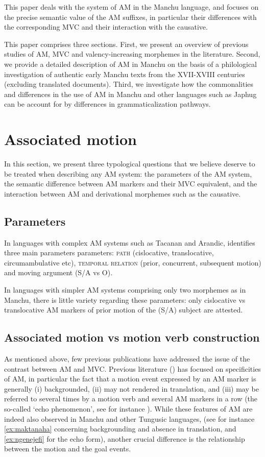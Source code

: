 \documentclass{article}
\begin{document}
This paper deals with the system of AM in the Manchu language, and focuses on the precise semantic value of the AM suffixes, in particular their differences with the corresponding MVC and their interaction with the causative. 

This paper comprises three sections. First, we present an overview of previous studies of AM, MVC and valency-increasing morphemes in the literature. Second, we provide a detailed description of AM in Manchu on the basis of a philological investigation of authentic early Manchu texts from the XVII-XVIII centuries (excluding translated documents). Third, we investigate how the commonalities and differences in the use of AM in Manchu and other languages such as Japhug can be account for by differences in grammaticalization pathways.

\section{Associated motion}
In this section, we present three typological questions that we believe deserve to be treated when describing any AM system: the parameters of the AM system, the semantic difference between AM markers and their MVC equivalent, and the interaction between AM and derivational morphemes such as the causative.

\subsection{Parameters}
In languages with complex AM systems such as Tacanan and Arandic, \citet[8]{guillaume16am} identifies three main parameters parameters: \textsc{path} (cislocative, translocative, circumambulative etc),  \textsc{temporal relation} (prior, concurrent, subsequent motion) and moving argument (S/A vs O). 

In languages with simpler AM systems comprising only two morphemes as in Manchu, there is little variety regarding these parameters: only cislocative vs translocative AM markers of prior motion of the (S/A) subject are attested.

\subsection{Associated motion vs motion verb construction} \label{sec:japhug.am.mvc}
As mentioned above, few previous publications have addressed the issue of the contrast between AM and MVC. Previous literature (\citealt{wilkins91associated.motion, guillaume16am}) has focused on specificities of AM, in particular the fact that a motion event expressed by an AM marker is generally (i) backgrounded, (ii) may not rendered in translation, and (iii) may be referred to several times by a motion verb and several AM markers in a row (the so-called `echo phenomenon', see for instance \citet[11]{guillaume16am}). While these features of AM are indeed also observed in Manchu and other Tungusic languages,  (see for instance \ref{ex:maktanaha} concerning backgrounding and absence in translation, and \ref{ex:ngenejefi} for the echo form), another crucial difference is the relationship between the motion and the goal events. 
\end{document}
